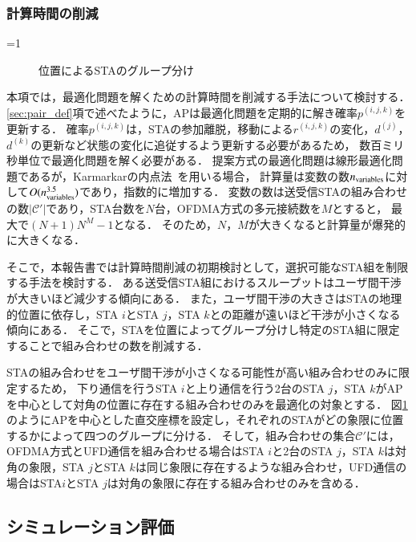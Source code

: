 \documentclass[technicalreport]{ieicej}
\newcounter{flagFig}
\newcommand{\pijk}{p^{(i,j,k)}}
\newcommand{\rijk}{r^{(i,j,k)}}
\newcommand{\mthc}{\mathcal C}
\newcommand{\mthcd}{{\mathcal C}'}
\begin{document}
		\subsubsection{計算時間の削減}\label{sec:time}
			\ifnum\value{flagFig}=1 {\begin{figure}[t]
				\centering
					\caption{位置によるSTAのグループ分け}
					\label{fig:time_image}
			\end{figure}}\fi
			本項では，最適化問題を解くための計算時間を削減する手法について検討する．
			\ref{sec:pair_def}項で述べたように，APは最適化問題を定期的に解き確率$\pijk$を更新する．
			確率$\pijk$は，STAの参加離脱，移動による$\rijk$の変化，$d^{(j)}$，$d^{(k)}$の更新など状態の変化に追従するよう更新する必要があるため，
			数百ミリ秒単位で最適化問題を解く必要がある．
			提案方式の最適化問題は線形最適化問題であるが，Karmarkarの内点法~\cite{karmarkar}を用いる場合，
			計算量は変数の数$n_{\rm variables}$に対して$O(n_{\rm variables}^{3.5})$であり，指数的に増加する．
			変数の数は送受信STAの組み合わせの数$|{\mthcd}|$であり，STA台数を$N$台，OFDMA方式の多元接続数を$M$とすると，
			最大で$(N+1)N^M-1$となる．
			そのため，$N$，$M$が大きくなると計算量が爆発的に大きくなる．
			\par
			そこで，本報告書では計算時間削減の初期検討として，選択可能なSTA組を制限する手法を検討する．
			ある送受信STA組におけるスループットはユーザ間干渉が大きいほど減少する傾向にある．
			また，ユーザ間干渉の大きさはSTAの地理的位置に依存し，STA $i$とSTA $j$，STA $k$との距離が遠いほど干渉が小さくなる傾向にある．
			そこで，STAを位置によってグループ分けし特定のSTA組に限定することで組み合わせの数を削減する．
			\par
			STAの組み合わせをユーザ間干渉が小さくなる可能性が高い組み合わせのみに限定するため，
			下り通信を行うSTA $i$と上り通信を行う2台のSTA $j$，STA $k$がAPを中心として対角の位置に存在する組み合わせのみを最適化の対象とする．
			図\ref{fig:time_image}のようにAPを中心とした直交座標を設定し，それぞれのSTAがどの象限に位置するかによって四つのグループに分ける．
			そして，組み合わせの集合$\mthc'$には，OFDMA方式とUFD通信を組み合わせる場合はSTA $i$と2台のSTA $j$，STA $k$は対角の象限，STA $j$とSTA $k$は同じ象限に存在するような組み合わせ，UFD通信の場合はSTA$i$とSTA $j$は対角の象限に存在する組み合わせのみを含める．

			\subsection{シミュレーション評価}
\end{document}
